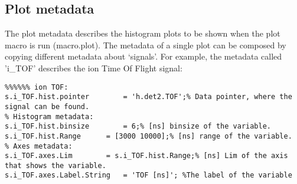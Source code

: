 \subsection{Plot metadata}
The plot metadata describes the histogram plots to be shown when the plot macro is run (macro.plot). The metadata of a single plot can be composed by copying different metadata about `signals'. For example, the metadata called 'i\_TOF' describes the ion Time Of Flight signal:

\begin{lstlisting}
%%%%%% ion TOF:
s.i_TOF.hist.pointer		= 'h.det2.TOF';% Data pointer, where the signal can be found. 
% Histogram metadata:
s.i_TOF.hist.binsize		= 6;% [ns] binsize of the variable. 
s.i_TOF.hist.Range		= [3000 10000];% [ns] range of the variable. 
% Axes metadata:
s.i_TOF.axes.Lim		= s.i_TOF.hist.Range;% [ns] Lim of the axis that shows the variable. 
s.i_TOF.axes.Label.String	= 'TOF [ns]'; %The label of the variable
\end{lstlisting}

